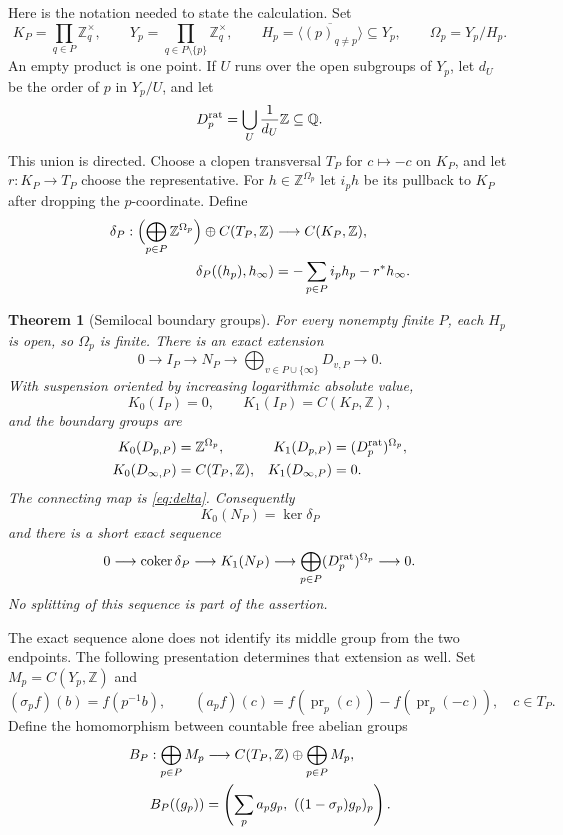 \documentclass[11pt]{article}
\newcommand{\Z}{\mathbb Z}
\newcommand{\Q}{\mathbb Q}
\newcommand{\coker}{\operatorname{coker}}
\newtheorem{theorem}{Theorem}[section]
\theoremstyle{definition}
\theoremstyle{remark}
\begin{document}
Here is the notation needed to state the calculation. Set
\[
 K_P=\prod_{q\in P}\Z_q^\times,
 \qquad
 Y_p=\prod_{q\in P\setminus\{p\}}\Z_q^\times,
 \qquad H_p=\overline{\langle(p)_{q\ne p}\rangle}\subseteq Y_p,
 \qquad \Omega_p=Y_p/H_p.
\]
An empty product is one point. If $U$ runs over the open subgroups of $Y_p$, let $d_U$ be the order of $p$ in $Y_p/U$, and let
\[
 D_p^{\rm rat}=\bigcup_U\frac1{d_U}\Z\subseteq\Q.
\]
This union is directed. Choose a clopen transversal $T_P$ for $c\mapsto-c$ on $K_P$, and let $r:K_P\to T_P$ choose the representative. For $h\in\Z^{\Omega_p}$ let $i_p h$ be its pullback to $K_P$ after dropping the $p$-coordinate. Define
\begin{align}
 \delta_P:\Bigl(\bigoplus_{p\in P}\Z^{\Omega_p}\Bigr)
       \oplus C(T_P,\Z)&\longrightarrow C(K_P,\Z),\label{eq:delta}\\
 \delta_P((h_p),h_\infty)&=-\sum_{p\in P}i_ph_p-r^*h_\infty.\notag
\end{align}

\begin{theorem}[Semilocal boundary groups]\label{thm:main}
For every nonempty finite $P$, each $H_p$ is open, so $\Omega_p$ is finite. There is an exact extension
\[
 0\longrightarrow I_P\longrightarrow N_P
 \longrightarrow \bigoplus_{v\in P\cup\{\infty\}}D_{v,P}\longrightarrow0.
\]
With suspension oriented by increasing logarithmic absolute value,
\[
 K_0(I_P)=0,\qquad K_1(I_P)=C(K_P,\Z),
\]
and the boundary groups are
\begin{align*}
 K_0(D_{p,P})&=\Z^{\Omega_p},&
 K_1(D_{p,P})&=(D_p^{\rm rat})^{\Omega_p},\\
 K_0(D_{\infty,P})&=C(T_P,\Z),&
 K_1(D_{\infty,P})&=0.
\end{align*}
The connecting map is \eqref{eq:delta}. Consequently
\[
 K_0(N_P)=\ker\delta_P
\]
and there is a short exact sequence
\begin{equation}\label{eq:mainK1}
 0\longrightarrow\coker\delta_P\longrightarrow K_1(N_P)
 \longrightarrow\bigoplus_{p\in P}(D_p^{\rm rat})^{\Omega_p}
 \longrightarrow0.
\end{equation}
No splitting of this sequence is part of the assertion.
\end{theorem}

The exact sequence alone does not identify its middle group from the two endpoints. The following presentation determines that extension as well. Set $M_p=C(Y_p,\Z)$ and
\[
 (\sigma_pf)(b)=f(p^{-1}b),\qquad
 (a_pf)(c)=f(\operatorname{pr}_p(c))-f(\operatorname{pr}_p(-c)),\quad c\in T_P.
\]
Define the homomorphism between countable free abelian groups
\begin{align}
 B_P:\bigoplus_{p\in P}M_p&\longrightarrow
 C(T_P,\Z)\oplus\bigoplus_{p\in P}M_p,\label{eq:fullB}\\
 B_P((g_p))&=\left(\sum_pa_pg_p,\ ((1-\sigma_p)g_p)_p\right).\notag
\end{align}
\end{document}
